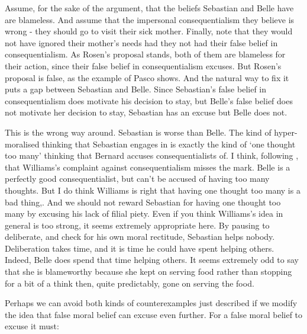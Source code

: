 Assume, for the sake of the argument, that the beliefs \gls{Sebastian} and \gls{Belle} have are blameless. And assume that the impersonal consequentialism they believe is wrong - they should go to visit their sick mother. Finally, note that they would not have ignored their mother's needs had they not had their false belief in consequentialism. As Rosen's proposal stands, both of them are blameless for their action, since their false belief in consequentialism excuses. But Rosen's proposal is false, as the example of \gls{Pasco} shows. And the natural way to fix it puts a gap between \gls{Sebastian} and \gls{Belle}. Since \gls{Sebastian}'s false belief in consequentialism does motivate his decision to stay, but \gls{Belle}'s false belief does not motivate her decision to stay, \gls{Sebastian} has an excuse but \gls{Belle} does not.

This is the wrong way around. \gls{Sebastian} is worse than \gls{Belle}. The kind of hyper-moralised thinking that \gls{Sebastian} engages in is exactly the kind of `one thought too many' thinking that Bernard \citet{Williams1981} accuses consequentialists of. I think, following \citet{Railton1984}, that Williams's complaint against consequentialism misses the mark. \gls{Belle} is a perfectly good consequentialist, but can't be accused of having too many thoughts. But I do think Williams is right that having one thought too many is a bad thing,. And we should not reward \gls{Sebastian} for having one thought too many by excusing his lack of filial piety. Even if you think Williams's idea in general is too strong, it seems extremely appropriate here. By pausing to deliberate, and check for his own moral rectitude, \gls{Sebastian} helps nobody. Deliberation takes time, and it is time he could have spent helping others. Indeed, \gls{Belle} does spend that time helping others. It seems extremely odd to say that she is blameworthy because she kept on serving food rather than stopping for a bit of a think then, quite predictably, gone on serving the food.

Perhaps we can avoid both kinds of counterexamples just described if we modify the idea that false moral belief can excuse even further. For a false moral belief to excuse it must:

